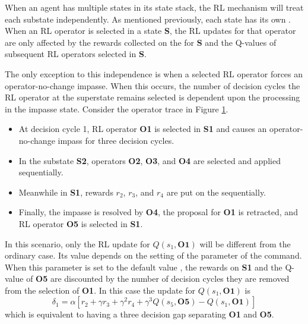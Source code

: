 When an agent has multiple states in its state stack, the RL mechanism will treat each substate independently.
As mentioned previously, each state has its own .
When an RL operator is selected in a state \textbf{S}, the RL updates for that operator are only affected by the rewards collected on the  for \textbf{S} and the Q-values of subsequent RL operators selected in \textbf{S}.

The only exception to this independence is when a selected RL operator forces an operator-no-change impasse.
When this occurs, the number of decision cycles the RL operator at the superstate remains selected is dependent upon the processing in the impasse state.
Consider the operator trace in Figure \ref{fig:rl-optrace}.

\begin{itemize}
	\item At decision cycle 1, RL operator \textbf{O1} is selected in \textbf{S1} and causes an operator-no-change impass for three decision cycles.
	\vspace{-6pt}
	\item In the substate \textbf{S2}, operators \textbf{O2}, \textbf{O3}, and \textbf{O4} are selected and applied sequentially.
	\vspace{-6pt}
	\item Meanwhile in \textbf{S1}, rewards $r_2$, $r_3$, and $r_4$ are put on the  sequentially.
	\vspace{-6pt}
	\item Finally, the impasse is resolved by \textbf{O4}, the proposal for \textbf{O1} is retracted, and RL operator \textbf{O5} is selected in \textbf{S1}.
	\vspace{-6pt}
\end{itemize}

\begin{figure}
	\label{fig:rl-optrace}
\end{figure}

In this scenario, only the RL update for $Q(s_1, \textbf{O1})$ will be different from the ordinary case.
Its value depends on the setting of the  parameter of the  command.
When this parameter is set to the default value , the rewards on \textbf{S1} and the Q-value of \textbf{O5} are discounted by the number of decision cycles they are removed from the selection of \textbf{O1}.
In this case the update for $Q(s_1, \textbf{O1})$ is
$$\delta_1 = \alpha \left[ r_2 + \gamma r_3 + \gamma^2 r_4 + \gamma^3 Q(s_5, \textbf{O5}) - Q(s_1, \textbf{O1}) \right]$$
which is equivalent to having a three decision gap separating \textbf{O1} and \textbf{O5}.

